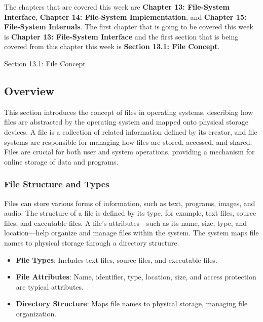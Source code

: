 The chapters that are covered this week are \textbf{Chapter 13: File-System Interface}, \textbf{Chapter 14: File-System Implementation}, and \textbf{Chapter 15: File-System Internals}. The first chapter that is going to be
covered this week is \textbf{Chapter 13: File-System Interface} and the first section that is being covered from this chapter this week is \textbf{Section 13.1: File Concept}.

\begin{notes}{Section 13.1: File Concept}
    \subsection*{Overview}

    This section introduces the concept of files in operating systems, describing how files are abstracted by the operating system and mapped onto physical storage devices. A file is a collection of 
    related information defined by its creator, and file systems are responsible for managing how files are stored, accessed, and shared. Files are crucial for both user and system operations, providing 
    a mechanism for online storage of data and programs.
    
    \subsubsection*{File Structure and Types}
    
    Files can store various forms of information, such as text, programs, images, and audio. The structure of a file is defined by its type, for example, text files, source files, and executable files. A 
    file's attributes—such as its name, size, type, and location—help organize and manage files within the system. The system maps file names to physical storage through a directory structure.
    
    \begin{highlight}
    
        \begin{itemize}
            \item \textbf{File Types}: Includes text files, source files, and executable files.
            \item \textbf{File Attributes}: Name, identifier, type, location, size, and access protection are typical attributes.
            \item \textbf{Directory Structure}: Maps file names to physical storage, managing file organization.
        \end{itemize}
    

\end{highlight}
\end{notes}
